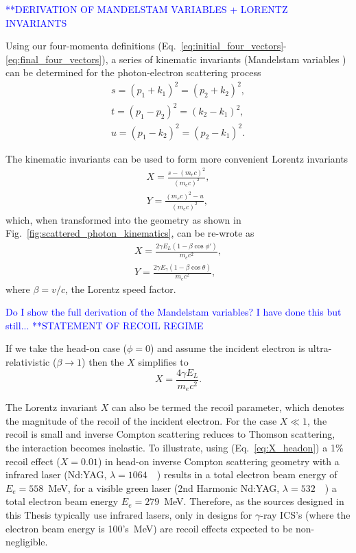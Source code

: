 \documentclass[../main.tex]{subfiles}
\begin{document}
\textcolor{blue}{**DERIVATION OF MANDELSTAM VARIABLES + LORENTZ INVARIANTS }

Using our four-momenta definitions (Eq.~\ref{eq:initial_four_vectors}-\ref{eq:final_four_vectors}), a  series of kinematic invariants (Mandelstam variables \cite{mandelstam1958determination}) can be determined for the photon-electron scattering process \cite{berestetskii1982quantum}
\begin{align}
s = \left(p_{1}+k_{1}\right)^{2} = \left(p_{2}+k_{2}\right)^{2},
\label{eq:s_Mandelstam} \\
t = \left(p_{1}-p_{2}\right)^{2} = \left(k_{2}-k_{1}\right)^{2},
\label{eq:t_Mandelstam} \\
u = \left(p_{1}-k_{2}\right)^{2} = \left(p_{2}-k_{1}\right)^{2}.
\label{eq:u_Mandelstam}
\end{align}

The kinematic invariants can be used to form more convenient Lorentz invariants
\begin{align}
X = \frac{s-\left(m_{e}c\right)^{2}}{\left(m_{e}c\right)^{2}},
\label{eq:X_Mandelstam} \\
Y = \frac{\left(m_{e}c\right)^{2}-u}{\left(m_{e}c\right)^{2}},
\label{eq:Y_Mandelstam}
\end{align}
which, when transformed into the geometry as shown in Fig.~\ref{fig:scattered_photon_kinematics}, can be re-wrote as
\begin{align}
X = \frac{2\gamma E_{L}\left(1-\beta\cos\phi'\right)}{m_{e}c^{2}},
\label{eq:X_geometry} \\
Y = \frac{2\gamma E_{\gamma}\left(1-\beta\cos\theta\right)}{m_{e}c^{2}},
\label{eq:Y_geometry}
\end{align}
where $\beta = v/c$, the Lorentz speed factor.

\textcolor{blue}{Do I show the full derivation of the Mandelstam variables? I have done this but still...}
\textcolor{blue}{**STATEMENT OF RECOIL REGIME}

If we take the head-on case ($\phi = 0$) and  assume the incident electron is ultra-relativistic ($\beta \rightarrow 1$) then the $X$ simplifies to 
\begin{equation}
X = \frac{4\gamma E_{L}}{m_{e}c^{2}}.
\label{eq:X_headon}
\end{equation}

The Lorentz invariant $X$ can also be termed the recoil parameter, which denotes the magnitude of the recoil of the incident electron. For the case $X \ll 1$, the recoil is small and inverse Compton scattering reduces to Thomson scattering, the interaction becomes inelastic. To illustrate, using (Eq.~\ref{eq:X_headon}) a 1\% recoil effect ($X = 0.01$) in head-on inverse Compton scattering geometry with a infrared laser (Nd:YAG, $\lambda = 1064$~\si{\nano\metres}) results in a total electron beam energy of $E_{e} = 558$~\si{\mega\electronvolt}, for a visible green laser (2nd Harmonic Nd:YAG, $\lambda = 532$~\si{\nano\metres}) a total electron beam energy $E_{e} = 279$~\si{\mega\electronvolt}. Therefore, as the sources designed in this Thesis typically use infrared lasers, only in designs for $\gamma$-ray ICS's (where the electron beam energy is 100's~\si{\mega\electronvolt}) are recoil effects expected to be non-negligible.     
\end{document}
